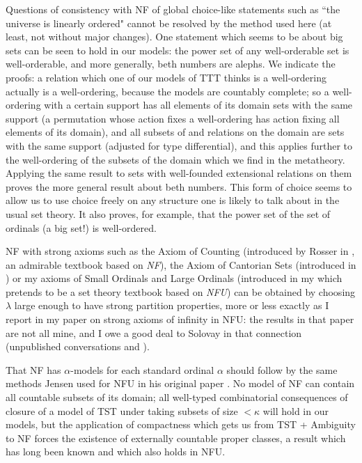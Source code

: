 \documentclass[112pt]{article}
\begin{document}
Questions of consistency with NF of global choice-like statements such as ``the universe is linearly ordered"  cannot be resolved by the method used here (at least, not without major changes).  One statement which seems to be about big sets can be seen to hold in our models:  the power set of any well-orderable set is well-orderable, and more generally, beth numbers are alephs.  We indicate the proofs:  a relation which one of our models of TTT thinks is a well-ordering actually is a well-ordering, because the models are countably complete;  so a well-ordering with a certain support has all elements of its domain sets with the same support (a permutation whose action fixes a well-ordering has action fixing all elements of its domain), and all subsets of and relations on the domain are sets with the same support (adjusted for type differential), and this applies further to the well-ordering of the subsets of the domain which we find in the metatheory.  Applying the same result to sets with well-founded extensional relations on them proves the more general result about beth numbers.  This form of choice seems to allow us to use choice freely on any structure one is likely to talk about in the usual set theory.  It also proves, for example, that the power set of the set of ordinals (a big set!) is well-ordered.

NF with strong axioms such as the Axiom of Counting (introduced by Rosser in \cite{rosser}, an admirable textbook based on {\em NF\/}), the Axiom of Cantorian Sets (introduced in \cite{henson})  or my axioms of Small Ordinals and Large Ordinals (introduced in  my \cite{mybook} which pretends to be a set theory textbook based on {\em NFU\/}) can be obtained by choosing $\lambda$ large enough to have strong partition properties, more or less exactly as I report in my paper \cite{strongaxioms} on strong axioms of infinity in NFU:  the results in that paper are not all mine, and I owe a good deal to Solovay in that connection (unpublished conversations and \cite{nfub}).

That NF has $\alpha$-models for each standard ordinal $\alpha$ should follow by the same methods Jensen used for NFU in his original paper \cite{nfu}.   No model of NF can contain all countable subsets of its domain;  all well-typed combinatorial consequences
of closure of a model of TST under taking subsets of size $<\kappa$ will hold in our models, but the application of compactness which gets us from TST + Ambiguity to NF forces the existence of externally countable proper classes, a result which has long been known and which also holds in NFU.
\end{document}
